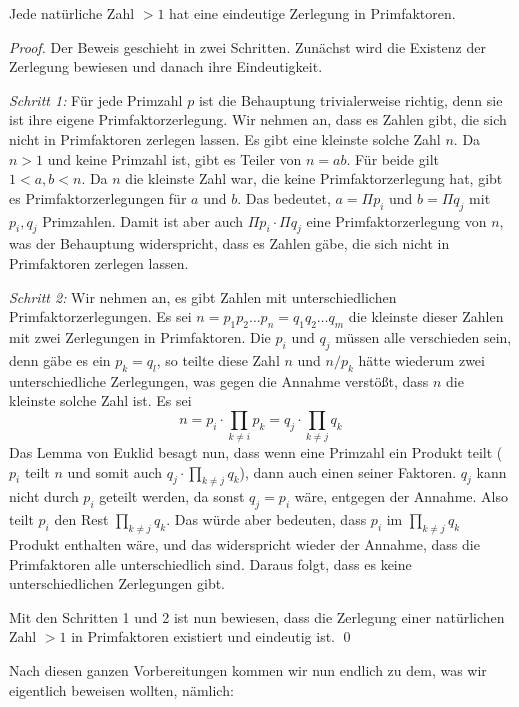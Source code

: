 \begin{lemma}\label{lem:prim}
Jede natürliche Zahl $>1$ hat eine eindeutige Zerlegung in Primfaktoren.
\end{lemma}
\begin{proof}
Der Beweis geschieht in zwei Schritten. Zunächst wird die Existenz der Zerlegung bewiesen und danach ihre Eindeutigkeit.

\noindent\textsl{Schritt 1:}
Für jede Primzahl $p$ ist die Behauptung trivialerweise richtig, denn sie ist ihre eigene Primfaktorzerlegung. 
Wir nehmen an, dass es Zahlen gibt, die sich nicht in Primfaktoren zerlegen lassen. Es gibt eine kleinste solche Zahl $n$. Da $n>1$ und keine Primzahl ist, gibt es Teiler von $n=ab$. Für beide gilt $1<a,b<n$. Da $n$ die kleinste Zahl war, die keine Primfaktorzerlegung hat, gibt es Primfaktorzerlegungen für $a$ und $b$. Das bedeutet, $a = \Pi p_i$ und $b=\Pi q_j$ mit $p_i,q_j$ Primzahlen. Damit ist aber auch $\Pi p_i \cdot \Pi q_j$ eine Primfaktorzerlegung von $n$, was der Behauptung widerspricht, dass es Zahlen gäbe, die sich nicht in Primfaktoren zerlegen lassen.

\noindent\textsl{Schritt 2:}
Wir nehmen an, es gibt Zahlen mit unterschiedlichen Primfaktorzerlegungen. Es sei $n=p_1 p_2 \dots p_n = q_1 q_2 \dots q_m$ die kleinste dieser Zahlen mit zwei Zerlegungen in Primfaktoren. Die $p_i$ und $q_j$ müssen alle verschieden sein, denn gäbe es ein $p_k=q_l$, so teilte diese Zahl $n$ und $n/p_k$ hätte wiederum zwei unterschiedliche Zerlegungen, was gegen die Annahme verstößt, dass $n$ die kleinste solche Zahl ist.
Es sei 
\[
n= p_i\cdot \prod_{k\ne i} p_k= q_j\cdot \prod_{k\ne j} q_k
\]
Das Lemma von Euklid besagt nun, dass wenn eine Primzahl ein Produkt teilt ($p_i$ teilt $n$ und somit auch $q_j\cdot \prod_{k\ne j} q_k$), dann auch einen seiner Faktoren. $q_j$ kann nicht durch $p_i$ geteilt werden, da sonst $q_j=p_i$ wäre, entgegen der Annahme. Also teilt $p_i$ den Rest $\prod_{k\ne j} q_k$. Das würde aber bedeuten, dass $p_i$ im $\prod_{k\ne j} q_k$ Produkt enthalten wäre, und das widerspricht wieder der Annahme, dass die Primfaktoren alle unterschiedlich sind. Daraus folgt, dass es keine unterschiedlichen Zerlegungen gibt.

Mit den Schritten 1 und 2 ist nun bewiesen, dass die Zerlegung einer natürlichen Zahl $>1$ in Primfaktoren existiert und eindeutig ist. 
\qed
\end{proof}

Nach diesen ganzen Vorbereitungen kommen wir nun endlich zu dem, was wir eigentlich beweisen wollten, nämlich:


